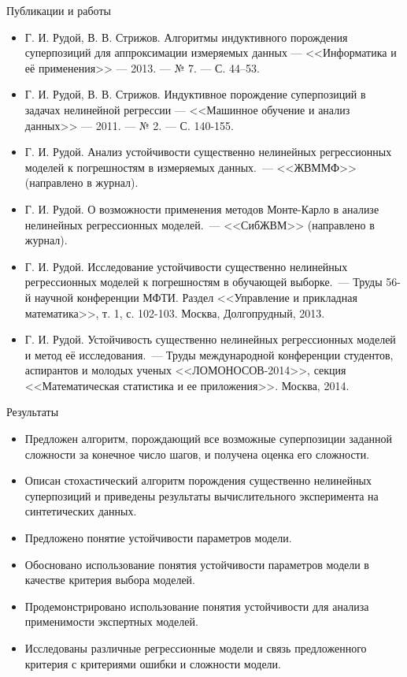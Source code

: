 \documentclass{beamer}
\begin{document}
\begin{frame}{Публикации и работы}
  \scriptsize
  \begin{itemize}
    \item Г. И. Рудой, В. В. Стрижов. Алгоритмы индуктивного порождения суперпозиций для аппроксимации измеряемых данных --- <<Информатика и её применения>> --- 2013. --- № 7. --- С. 44--53.
    \item Г. И. Рудой, В. В. Стрижов. Индуктивное порождение суперпозиций в задачах нелинейной регрессии --- <<Машинное обучение и анализ данных>> --- 2011. --- № 2. --- С. 140-155.
    \item Г. И. Рудой. Анализ устойчивости существенно нелинейных регрессионных моделей к погрешностям в измеряемых данных.~--- <<ЖВММФ>> (направлено в журнал).
    \item Г. И. Рудой. О возможности применения методов Монте-Карло в анализе нелинейных регрессионных моделей.~--- <<СибЖВМ>> (направлено в журнал).
    \item Г. И. Рудой. Исследование устойчивости существенно нелинейных регрессионных моделей к погрешностям в обучающей выборке.~--- Труды 56-й научной конференции МФТИ. Раздел <<Управление и прикладная математика>>, т. 1, с. 102-103. Москва, Долгопрудный, 2013.
    \item Г. И. Рудой. Устойчивость существенно нелинейных регрессионных моделей и метод её исследования.~--- Труды международной конференции студентов, аспирантов и молодых ученых <<ЛОМОНОСОВ-2014>>, секция <<Математическая статистика и ее приложения>>. Москва, 2014.
  \end{itemize}
\end{frame}

\begin{frame}{Результаты}
  \begin{itemize}
    \item Предложен алгоритм, порождающий все возможные суперпозиции заданной сложности за конечное число шагов, и получена оценка его сложности.
    \item Описан стохастический алгоритм порождения существенно нелинейных суперпозиций и приведены результаты вычислительного эксперимента на синтетических данных.
    \item Предложено понятие устойчивости параметров модели.
    \item Обосновано использование понятия устойчивости параметров модели в качестве критерия выбора моделей.
    \item Продемонстрировано использование понятия устойчивости для анализа применимости экспертных моделей.
    \item Исследованы различные регрессионные модели и связь предложенного критерия с критериями ошибки и сложности модели.
  \end{itemize}
\end{frame}
\end{document}
